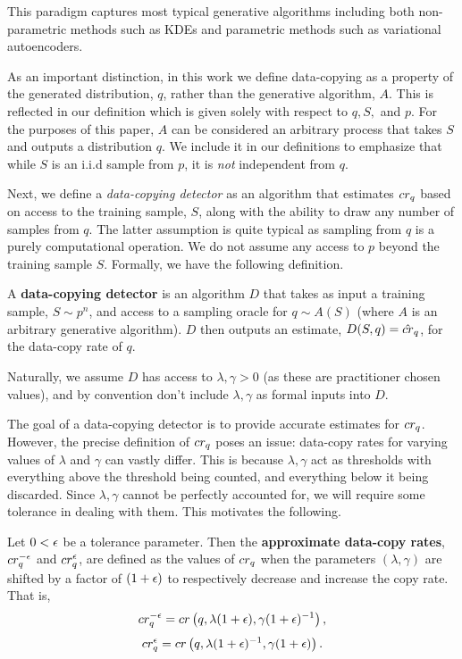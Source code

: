 This paradigm captures most typical generative algorithms including both non-parametric methods such as KDEs and parametric methods such as variational autoencoders.

As an important distinction, in this work we define data-copying as a property of the generated distribution, $q$, rather than the generative algorithm, $A$. This is reflected in our definition which is given solely with respect to $q, S,$ and $p$. For the purposes of this paper, $A$ can be considered an arbitrary process that takes $S$ and outputs a distribution $q$. We include it in our definitions to emphasize that while $S$ is an i.i.d sample from $p$, it is \textit{not} independent from $q$. 

Next, we define a \textit{data-copying detector} as an algorithm that estimates $cr_q$ based on access to the training sample, $S$, along with the ability to draw any number of samples from $q$. The latter assumption is quite typical as sampling from $q$ is a purely computational operation. We do not assume any access to $p$ beyond the training sample $S$. Formally, we have the following definition.

\begin{definition}\label{def:data_copy_detector}
A \textbf{data-copying detector} is an algorithm $D$ that takes as input a training sample, $S \sim p^n$, and access to a sampling oracle for $q \sim A(S)$ (where $A$ is an arbitrary generative algorithm). $D$ then outputs an estimate, $D(S, q) = \hat{cr}_q$, for the data-copy rate of $q$. 
\end{definition}

Naturally, we assume $D$ has access to $\lambda, \gamma >0$ (as these are practitioner chosen values), and by convention don't include $\lambda, \gamma$ as formal inputs into $D$. 

The goal of a data-copying detector is to provide accurate estimates for $cr_q$. However, the precise definition of $cr_q$ poses an issue: data-copy rates for varying values of $\lambda$ and $ \gamma$ can vastly differ. This is because $\lambda, \gamma$ act as thresholds with everything above the threshold being counted, and everything below it being discarded. Since $\lambda, \gamma$ cannot be perfectly accounted for, we will require some tolerance in dealing with them. This motivates the following.

\begin{definition}\label{defn:approx_data_copy_rate}
Let $0 < \epsilon$ be a tolerance parameter. Then the \textbf{approximate data-copy rates}, $cr_q^{-\epsilon}$ and $cr_q^\epsilon$, are defined as the values of $cr_q$ when the parameters $(\lambda, \gamma)$ are shifted by a factor of $(1+\epsilon)$ to respectively decrease and increase the copy rate. That is, $$cr_q^{-\epsilon} = cr\left(q, \lambda (1+\epsilon), \gamma (1+\epsilon)^{-1}\right),$$ $$cr_q^{\epsilon} = cr\left(q, \lambda (1+\epsilon)^{-1}, \gamma (1+\epsilon)\right).$$
\end{definition}


